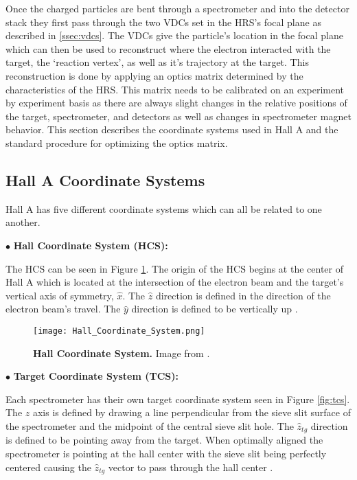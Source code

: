 Once the charged particles are bent through a spectrometer and into the detector stack they first pass through the two VDCs set in the HRS's focal plane as described in \ref{ssec:vdcs}. The VDCs give the particle's location in the focal plane which can then be used to reconstruct where the electron interacted with the target, the `reaction vertex', as well as it's trajectory at the target. This reconstruction is done by applying an optics matrix determined by the characteristics of the HRS. This matrix needs to be calibrated on an experiment by experiment basis as there are always slight changes in the relative positions of the target, spectrometer, and detectors as well as changes in spectrometer magnet behavior. This section describes the coordinate systems used in Hall A and the standard procedure for optimizing the optics matrix. 

\subsection{Hall A Coordinate Systems}
\label{ssec:coordinates}

Hall A has five different coordinate systems which can all be related to one another. 

\noindent $\bullet$ \textbf{Hall Coordinate System (HCS):}

The HCS can be seen in Figure \ref{fig:hcs}. The origin of the HCS begins at the center of Hall A which is located at the intersection of the electron beam and the target's vertical axis of symmetry, $\hat{x}$. The $\hat{z}$ direction is defined in the direction of the electron beam's travel. The $\hat{y}$ direction is defined to be vertically up \cite{optics}.

\begin{figure}[!ht]
\begin{center}
\texttt{[image: Hall\_Coordinate\_System.png]}
\end{center}
\caption[Hall Coordinate System]{
{\bf{Hall Coordinate System.}} Image from \cite{optics}.}
\label{fig:hcs}
\end{figure}

\noindent $\bullet$ \textbf{Target Coordinate System (TCS):}

Each spectrometer has their own target coordinate system seen in Figure \ref{fig:tcs}. The $z$ axis is defined by drawing a line perpendicular from the sieve slit surface of the spectrometer and the midpoint of the central sieve slit hole. The $\hat{z}_{tg}$ direction is defined to be pointing away from the target. When optimally aligned the spectrometer is pointing at the hall center with the sieve slit being perfectly centered causing the $\hat{z}_{tg}$ vector to pass through the hall center \cite{optics}. 

